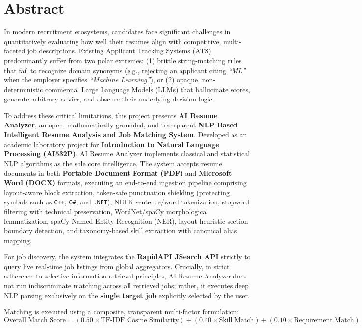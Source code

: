 \documentclass[12pt,a4paper]{report}
\begin{document}
\newpage
\chapter*{Abstract}
\thispagestyle{plain}

In modern recruitment ecosystems, candidates face significant challenges in quantitatively evaluating how well their resumes align with competitive, multi-faceted job descriptions. Existing Applicant Tracking Systems (ATS) predominantly suffer from two polar extremes: (1) brittle string-matching rules that fail to recognize domain synonyms (e.g., rejecting an applicant citing \textit{“ML”} when the employer specifies \textit{“Machine Learning”}), or (2) opaque, non-deterministic commercial Large Language Models (LLMs) that hallucinate scores, generate arbitrary advice, and obscure their underlying decision logic.

To address these critical limitations, this project presents \textbf{AI Resume Analyzer}, an open, mathematically grounded, and transparent \textbf{NLP-Based Intelligent Resume Analysis and Job Matching System}. Developed as an academic laboratory project for \textbf{Introduction to Natural Language Processing (AI532P)}, AI Resume Analyzer implements classical and statistical NLP algorithms as the sole core intelligence. The system accepts resume documents in both \textbf{Portable Document Format (PDF)} and \textbf{Microsoft Word (DOCX)} formats, executing an end-to-end ingestion pipeline comprising layout-aware block extraction, token-safe punctuation shielding (protecting symbols such as \texttt{C++}, \texttt{C\#}, and \texttt{.NET}), NLTK sentence/word tokenization, stopword filtering with technical preservation, WordNet/spaCy morphological lemmatization, spaCy Named Entity Recognition (NER), layout heuristic section boundary detection, and taxonomy-based skill extraction with canonical alias mapping.

For job discovery, the system integrates the \textbf{RapidAPI JSearch API} strictly to query live real-time job listings from global aggregators. Crucially, in strict adherence to selective information retrieval principles, AI Resume Analyzer does not run indiscriminate matching across all retrieved jobs; rather, it executes deep NLP parsing exclusively on the \textbf{single target job} explicitly selected by the user.

Matching is executed using a composite, transparent multi-factor formulation:
$$\text{Overall Match Score} = (0.50 \times \text{TF-IDF Cosine Similarity}) + (0.40 \times \text{Skill Match}) + (0.10 \times \text{Requirement Match})$$
\end{document}
